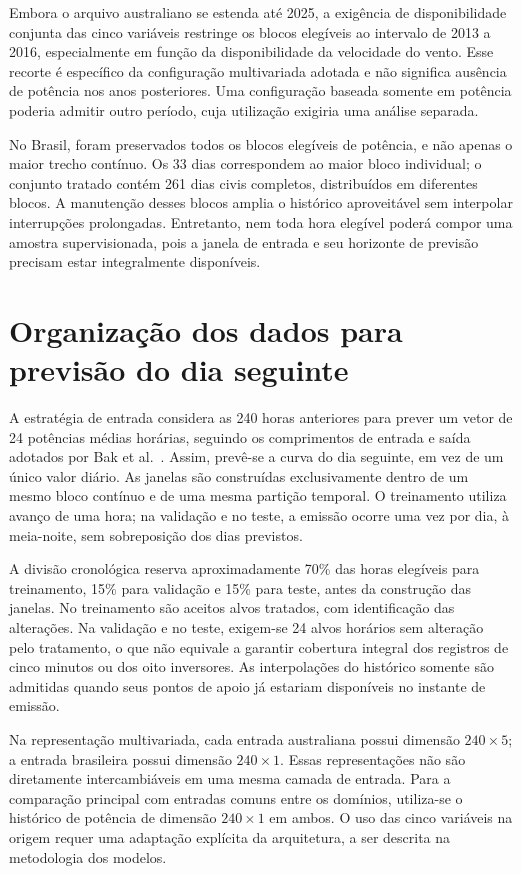 Embora o arquivo australiano se estenda até 2025, a exigência de disponibilidade conjunta das cinco variáveis restringe os blocos elegíveis ao intervalo de 2013 a 2016, especialmente em função da disponibilidade da velocidade do vento. Esse recorte é específico da configuração multivariada adotada e não significa ausência de potência nos anos posteriores. Uma configuração baseada somente em potência poderia admitir outro período, cuja utilização exigiria uma análise separada.

No Brasil, foram preservados todos os blocos elegíveis de potência, e não apenas o maior trecho contínuo. Os 33 dias correspondem ao maior bloco individual; o conjunto tratado contém 261 dias civis completos, distribuídos em diferentes blocos. A manutenção desses blocos amplia o histórico aproveitável sem interpolar interrupções prolongadas. Entretanto, nem toda hora elegível poderá compor uma amostra supervisionada, pois a janela de entrada e seu horizonte de previsão precisam estar integralmente disponíveis.

\section{Organização dos dados para previsão do dia seguinte}
\label{sec:organizacao_supervisionada}

A estratégia de entrada considera as 240 horas anteriores para prever um vetor de 24 potências médias horárias, seguindo os comprimentos de entrada e saída adotados por Bak et al.\ \cite{bak2025transfer}. Assim, prevê-se a curva do dia seguinte, em vez de um único valor diário. As janelas são construídas exclusivamente dentro de um mesmo bloco contínuo e de uma mesma partição temporal. O treinamento utiliza avanço de uma hora; na validação e no teste, a emissão ocorre uma vez por dia, à meia-noite, sem sobreposição dos dias previstos.

A divisão cronológica reserva aproximadamente 70\% das horas elegíveis para treinamento, 15\% para validação e 15\% para teste, antes da construção das janelas. No treinamento são aceitos alvos tratados, com identificação das alterações. Na validação e no teste, exigem-se 24 alvos horários sem alteração pelo tratamento, o que não equivale a garantir cobertura integral dos registros de cinco minutos ou dos oito inversores. As interpolações do histórico somente são admitidas quando seus pontos de apoio já estariam disponíveis no instante de emissão.

Na representação multivariada, cada entrada australiana possui dimensão $240\times5$; a entrada brasileira possui dimensão $240\times1$. Essas representações não são diretamente intercambiáveis em uma mesma camada de entrada. Para a comparação principal com entradas comuns entre os domínios, utiliza-se o histórico de potência de dimensão $240\times1$ em ambos. O uso das cinco variáveis na origem requer uma adaptação explícita da arquitetura, a ser descrita na metodologia dos modelos.

